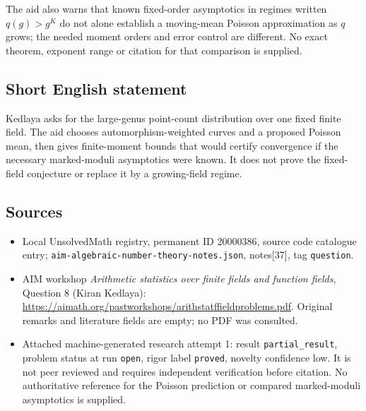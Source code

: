 \documentclass[11pt]{article}
\begin{document}
The aid also warns that known fixed-order asymptotics in regimes written $q(g)>g^K$ do not alone establish a moving-mean Poisson approximation as $q$ grows; the needed moment orders and error control are different. No exact theorem, exponent range or citation for that comparison is supplied.
\subsection{Short English statement}
Kedlaya asks for the large-genus point-count distribution over one fixed finite field. The aid chooses automorphism-weighted curves and a proposed Poisson mean, then gives finite-moment bounds that would certify convergence if the necessary marked-moduli asymptotics were known. It does not prove the fixed-field conjecture or replace it by a growing-field regime.
\subsection{Sources}
\begin{itemize}
\item Local UnsolvedMath registry, permanent ID 20000386, source code catalogue entry; \texttt{aim-algebraic-number-theory-notes.json}, notes[37], tag \texttt{question}.
\item AIM workshop \emph{Arithmetic statistics over finite fields and function fields}, Question 8 (Kiran Kedlaya): \url{https://aimath.org/pastworkshops/arithstatffieldproblems.pdf}. Original remarks and literature fields are empty; no PDF was consulted.
\item Attached machine-generated research attempt 1: result \texttt{partial\_result}, problem status at run \texttt{open}, rigor label \texttt{proved}, novelty confidence low. It is not peer reviewed and requires independent verification before citation. No authoritative reference for the Poisson prediction or compared marked-moduli asymptotics is supplied.
\end{itemize}
\end{document}
